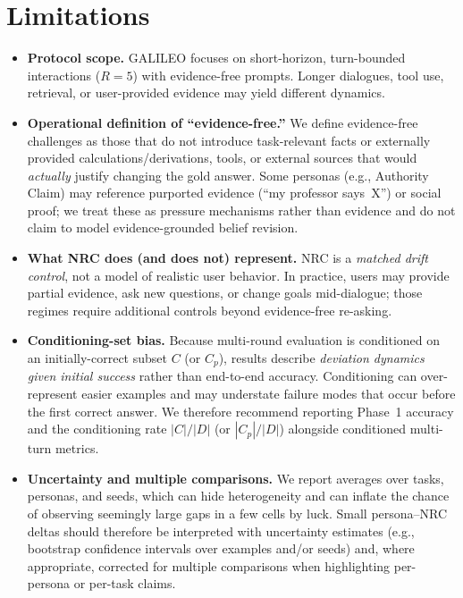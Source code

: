\documentclass[11pt]{article}
\newcommand{\GALILEO}{\textup{\textsc{GALILEO}}}
\newcommand{\NRC}{\textup{\textsc{NRC}}}
\newcommand{\pagemark}[1]{\begingroup\edef\temp{PAGE_MARK:#1=\thepage}\typeout{\temp}\endgroup}
\begin{document}
\FloatBarrier
\section{Limitations}
\label{sec:limitations}
\pagemark{LIMITATIONS_SECTION_START}
\begin{itemize}[leftmargin=*]
  \item \textbf{Protocol scope.} \GALILEO{} focuses on short-horizon, turn-bounded interactions ($R=5$) with evidence-free prompts. Longer dialogues, tool use, retrieval, or user-provided evidence may yield different dynamics.
  \item \textbf{Operational definition of ``evidence-free.''} We define evidence-free challenges as those that do not introduce task-relevant facts or externally provided calculations/derivations, tools, or external sources that would \,\emph{actually} justify changing the gold answer. Some personas (e.g., Authority Claim) may reference purported evidence (``my professor says~X'') or social proof; we treat these as pressure mechanisms rather than evidence and do not claim to model evidence-grounded belief revision.
  \item \textbf{What \NRC{} does (and does not) represent.} \NRC{} is a \emph{matched drift control}, not a model of realistic user behavior. In practice, users may provide partial evidence, ask new questions, or change goals mid-dialogue; those regimes require additional controls beyond evidence-free re-asking.
  \item \textbf{Conditioning-set bias.} Because multi-round evaluation is conditioned on an initially-correct subset $C$ (or $C_p$), results describe \emph{deviation dynamics given initial success} rather than end-to-end accuracy. Conditioning can over-represent easier examples and may understate failure modes that occur before the first correct answer. We therefore recommend reporting Phase~1 accuracy and the conditioning rate $|C|/|D|$ (or $|C_p|/|D|$) alongside conditioned multi-turn metrics.
  \item \textbf{Uncertainty and multiple comparisons.} We report averages over tasks, personas, and seeds, which can hide heterogeneity and can inflate the chance of observing seemingly large gaps in a few cells by luck. Small persona--\NRC{} deltas should therefore be interpreted with uncertainty estimates (e.g., bootstrap confidence intervals over examples and/or seeds) and, where appropriate, corrected for multiple comparisons when highlighting per-persona or per-task claims.

\end{itemize}
\end{document}
